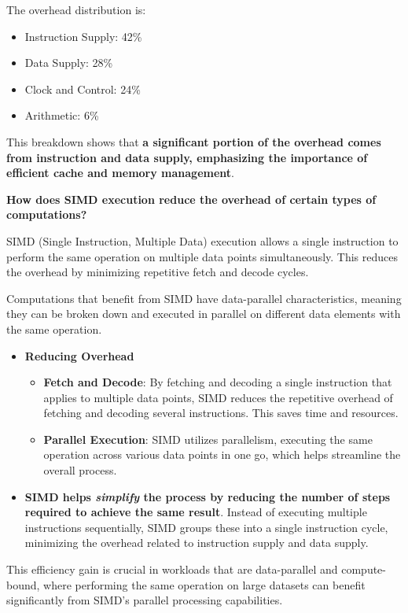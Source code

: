 \newpage

\noindent
The overhead distribution is:
\begin{multicols}{2}
    \begin{itemize}
        \item Instruction Supply: 42\%
        \item Data Supply: 28\%
        \item Clock and Control: 24\%
        \item Arithmetic: 6\%
    \end{itemize}
\end{multicols}
\noindent
This breakdown shows that \textbf{a significant portion of the overhead comes from instruction and data supply, emphasizing the importance of efficient cache and memory management}.

\highspace
\begin{flushleft}
    \textcolor{Green3}{ \textbf{How does SIMD execution reduce the overhead of certain types of computations?}}
\end{flushleft}
SIMD (Single Instruction, Multiple Data) execution allows a single instruction to perform the same operation on multiple data points simultaneously. This reduces the overhead by minimizing repetitive fetch and decode cycles.

\highspace
Computations that benefit from SIMD have data-parallel characteristics, meaning they can be broken down and executed in parallel on different data elements with the same operation.
\begin{itemize}[label=\textcolor{Green3}{}]
    \item \textcolor{Green3}{\textbf{Reducing Overhead}}
    \begin{itemize}
        \item \textbf{Fetch and Decode}: By fetching and decoding a single instruction that applies to multiple data points, SIMD reduces the repetitive overhead of fetching and decoding several instructions. This saves time and resources.
        \item \textbf{Parallel Execution}: SIMD utilizes parallelism, executing the same operation across various data points in one go, which helps streamline the overall process.
    \end{itemize}
    \item \textbf{SIMD helps \emph{simplify} the process by reducing the number of steps required to achieve the same result}. Instead of executing multiple instructions sequentially, SIMD groups these into a single instruction cycle, minimizing the overhead related to instruction supply and data supply.
\end{itemize}
This efficiency gain is crucial in workloads that are data-parallel and compute-bound, where performing the same operation on large datasets can benefit significantly from SIMD's parallel processing capabilities.

